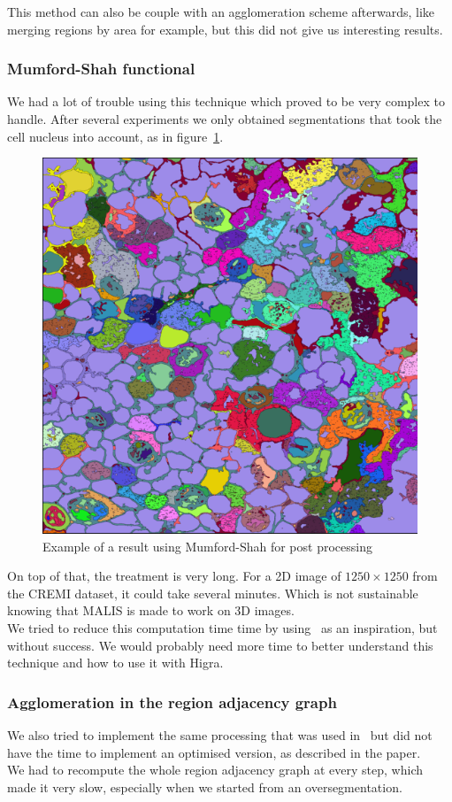 This method can also be couple with an agglomeration scheme afterwards, like
merging regions by area for example, but this did not give us interesting
results.

\subsubsection{Mumford-Shah functional}

We had a lot of trouble using this technique which proved to be very complex to
handle. After several experiments we only obtained segmentations that took the
cell nucleus into account, as in figure~\ref{fig:mumford-shah}.

\begin{figure}[!htbp]
	\centering
	\includegraphics[width=0.3\linewidth]{./images/mumford_shah.png}
	\caption{Example of a result using Mumford-Shah for post processing}%
	\label{fig:mumford-shah}
\end{figure}

On top of that, the treatment is very long. For a 2D image of $1250\times1250$ from the
CREMI dataset,  it could take several minutes. Which is not sustainable knowing that
MALIS is made to work on 3D images.\\

We tried to reduce this computation time time by
using~\cite{perret_removing_2019}
as an inspiration, but without success. We would probably need more time to
better understand this technique and how to use it with Higra.


\subsubsection{Agglomeration in the region adjacency graph}

We also tried to implement the same processing that was used
in~\cite{funke_large_2019} but did not have the time to implement an optimised
version, as described in the paper.\\
We had to recompute the whole region adjacency graph at every step, which made
it very slow, especially when we started from an oversegmentation.\\

